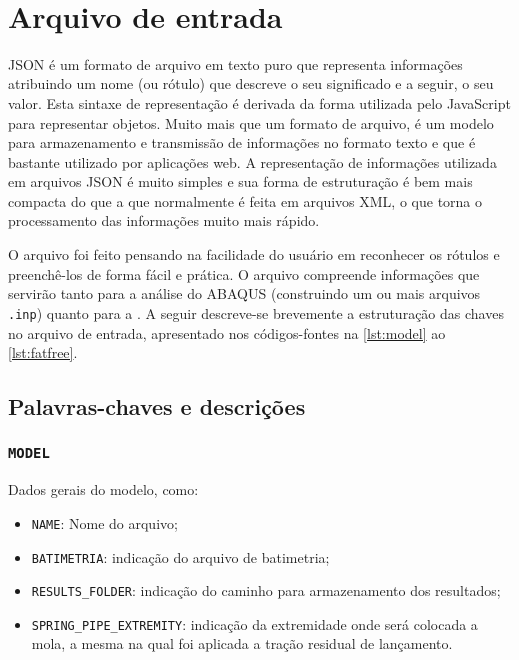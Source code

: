 \apendices\

\chapter{Arquivo de entrada\label{apendice:json}}

JSON é um formato de arquivo em texto puro que representa informações atribuindo um nome (ou rótulo) que descreve o seu significado e a seguir, o seu valor. Esta sintaxe de representação é derivada da forma utilizada pelo JavaScript para representar objetos. Muito mais que um formato de arquivo, é um modelo para armazenamento e transmissão de informações no formato texto e que é bastante utilizado por aplicações web. A representação de informações utilizada em arquivos JSON é muito simples e sua forma de estruturação é bem mais compacta do que a que normalmente é feita em arquivos XML, o que torna o processamento das informações muito mais rápido.

O arquivo foi feito pensando na facilidade do usuário em reconhecer os rótulos e preenchê-los de forma fácil e prática.
O arquivo compreende informações que servirão tanto para a análise do ABAQUS (construindo um ou mais arquivos \texttt{.inp}) quanto para a \fatfree.
A seguir descreve-se brevemente a estruturação das chaves no arquivo de entrada, apresentado nos códigos-fontes na \autoref{lst:model} ao \autoref{lst:fatfree}.

\section{Palavras-chaves e descrições}

\subsection{\texttt{MODEL}}

Dados gerais do modelo, como:

\begin{itemize}
  \item \texttt{NAME}: Nome do arquivo;
  \item \texttt{BATIMETRIA}: indicação do arquivo de batimetria;
  \item \texttt{RESULTS\_FOLDER}: indicação do caminho para armazenamento dos resultados;
  \item \texttt{SPRING\_PIPE\_EXTREMITY}: indicação da extremidade onde será colocada a mola, a mesma na qual foi aplicada a tração residual de lançamento.
\end{itemize}

